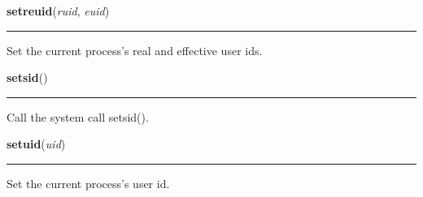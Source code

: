 \hspace{.8\funcindent}\begin{boxedminipage}{\funcwidth}

    \raggedright \textbf{setreuid}(\textit{ruid}, \textit{euid})

    \vspace{-1.5ex}

    \rule{\textwidth}{0.5\fboxrule}
\setlength{\parskip}{2ex}
    Set the current process's real and effective user ids.

\setlength{\parskip}{1ex}
    \end{boxedminipage}

    \label{os:setsid}

    \vspace{0.5ex}

\hspace{.8\funcindent}\begin{boxedminipage}{\funcwidth}

    \raggedright \textbf{setsid}()

    \vspace{-1.5ex}

    \rule{\textwidth}{0.5\fboxrule}
\setlength{\parskip}{2ex}
    Call the system call setsid().

\setlength{\parskip}{1ex}
    \end{boxedminipage}

    \label{os:setuid}

    \vspace{0.5ex}

\hspace{.8\funcindent}\begin{boxedminipage}{\funcwidth}

    \raggedright \textbf{setuid}(\textit{uid})

    \vspace{-1.5ex}

    \rule{\textwidth}{0.5\fboxrule}
\setlength{\parskip}{2ex}
    Set the current process's user id.

\setlength{\parskip}{1ex}
    \end{boxedminipage}

    \label{os:spawnl}

    \vspace{0.5ex}

